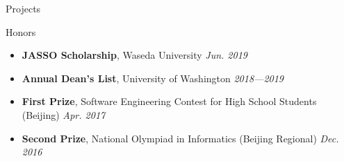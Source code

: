 \documentclass{resume}
\begin{document}
\begin{rSection}{Projects}



	\end{rSection}
	\vspace{-5pt}
	

	\begin{rSection}{Honors}
		\begin{itemize}
			\setlength{\itemsep}{1pt}
			\setlength{\parskip}{0pt}
			\setlength{\parsep}{0pt}
			\item \textbf{JASSO Scholarship}, Waseda University \hfill {\em Jun. 2019}
			\item \textbf{Annual Dean's List}, University of Washington \hfill {\em 2018---2019}
			\item \textbf{First Prize}, Software Engineering Contest for High School Students (Beijing) \hfill {\em Apr. 2017}
			\item \textbf{Second Prize}, National Olympiad in Informatics (Beijing Regional) \hfill {\em Dec. 2016}
		\end{itemize}
	\end{rSection}
\end{document}
